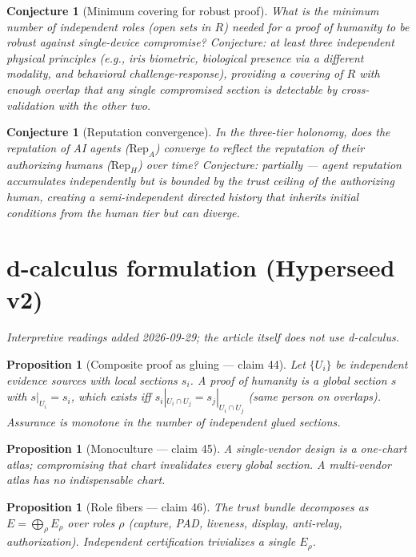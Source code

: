 \documentclass[11pt,a4paper]{article}
\newtheorem{proposition}[definition]{Proposition}
\newtheorem{conjecture}[definition]{Conjecture}
\begin{document}
\begin{conjecture}[Minimum covering for robust proof]
What is the minimum number of independent roles (open sets in $R$)
needed for a proof of humanity to be robust against single-device
compromise? Conjecture: at least three independent physical principles
(e.g., iris biometric, biological presence via a different modality,
and behavioral challenge-response), providing a covering of $R$ with
enough overlap that any single compromised section is detectable by
cross-validation with the other two.
\end{conjecture}

\begin{conjecture}[Reputation convergence]
In the three-tier holonomy, does the reputation of AI agents
($\text{Rep}_A$) converge to reflect the reputation of their authorizing
humans ($\text{Rep}_H$) over time? Conjecture: partially --- agent
reputation accumulates independently but is bounded by the trust
ceiling of the authorizing human, creating a semi-independent
directed history that inherits initial conditions from the human tier
but can diverge.
\end{conjecture}


\section{d-calculus formulation (Hyperseed v2)}
\emph{Interpretive readings added 2026-09-29; the article itself does not use d-calculus.}

\begin{proposition}[Composite proof as gluing --- claim 44]
Let $\{U_i\}$ be independent evidence sources with local sections $s_i$.
A proof of humanity is a global section $s$ with $s|_{U_i}=s_i$, which exists
iff $s_i|_{U_i\cap U_j}=s_j|_{U_i\cap U_j}$ (same person on overlaps).
Assurance is monotone in the number of independent glued sections.
\end{proposition}

\begin{proposition}[Monoculture --- claim 45]
A single-vendor design is a one-chart atlas; compromising that chart
invalidates every global section. A multi-vendor atlas has no indispensable chart.
\end{proposition}

\begin{proposition}[Role fibers --- claim 46]
The trust bundle decomposes as $E=\bigoplus_{\rho} E_\rho$ over roles $\rho$
(capture, PAD, liveness, display, anti-relay, authorization). Independent
certification trivializes a single $E_\rho$.
\end{proposition}
\end{document}
